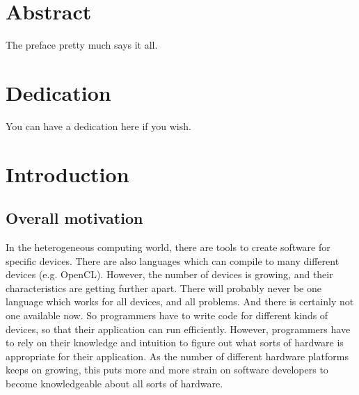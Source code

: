 \documentclass[12pt,twoside]{reedthesis}
\begin{document}
    \tableofcontents
    \listoftables
    \listoffigures

    \chapter*{Abstract}
	The preface pretty much says it all.

	\chapter*{Dedication}
	You can have a dedication here if you wish.

  \mainmatter %
  \pagestyle{fancyplain} %





\chapter*{Introduction}
\lstset{language=C++}

	\section{Overall motivation}

		In the heterogeneous computing world, there are tools to create software for specific devices. There are also languages which can compile to many different devices (e.g. OpenCL). However, the number of devices is growing, and their characteristics are getting further apart. There will probably never be one language which works for all devices, and all problems. And there is certainly not one available now. So programmers have to write code for different kinds of devices, so that their application can run efficiently. However, programmers have to rely on their knowledge and intuition to figure out what sorts of hardware is appropriate for their application. As the number of different hardware platforms keeps on growing, this puts more and more strain on software developers to become knowledgeable about all sorts of hardware.
\end{document}
